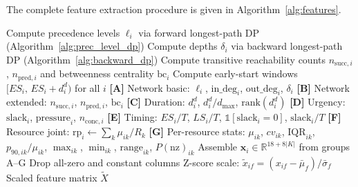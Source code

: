The complete feature extraction procedure is given in
Algorithm~\ref{alg:features}.
\begin{algorithm}[ht]
\caption{Comprehensive feature extraction for activity grouping}
\label{alg:features}
\begin{algorithmic}[1]
\State Compute precedence levels $\ell_i$ via forward
       longest-path DP (Algorithm~\ref{alg:prec_level_dp})
\State Compute depths $\delta_i$ via backward longest-path DP
       (Algorithm~\ref{alg:backward_dp})
\State Compute transitive reachability counts
       $n_{\mathrm{succ},i}$, $n_{\mathrm{pred},i}$
       and betweenness centrality $\mathrm{bc}_i$
\State Compute early-start windows
       $[ES_i,\, ES_i + d_i^d)$ for all $i$
    \State \textbf{[A]} Network basic:
           $\ell_i$, $\mathrm{in\_deg}_i$,
           $\mathrm{out\_deg}_i$, $\delta_i$
    \State \textbf{[B]} Network extended:
           $n_{\mathrm{succ},i}$,
           $n_{\mathrm{pred},i}$, $\mathrm{bc}_i$
    \State \textbf{[C]} Duration:
           $d_i^d$, $d_i^d / d_{\max}$,
           $\mathrm{rank}(d_i^d)$
    \State \textbf{[D]} Urgency:
           $\mathrm{slack}_i$,
           $\mathrm{pressure}_i$,
           $n_{\mathrm{conc},i}$
    \State \textbf{[E]} Timing:
           $ES_i/T$, $LS_i/T$,
           $\mathbb{1}[\mathrm{slack}_i{=}0]$,
           $\mathrm{slack}_i/T$
    \State \textbf{[F]} Resource joint:
           $\mathrm{rp}_i \leftarrow
           \sum_{k} \mu_{ik}/R_k$
        \State \textbf{[G]} Per-resource stats:
               $\mu_{ik}$, $cv_{ik}$,
               $\mathrm{IQR}_{ik}$,
               $p_{90,ik}/\mu_{ik}$,
               $\max_{ik}$, $\min_{ik}$,
               $\mathrm{range}_{ik}$,
               $P(\text{nz})_{ik}$
    \EndFor
    \State Assemble $\mathbf{x}_i \in \mathbb{R}^{18+8|K|}$
           from groups A--G
\EndFor
\State Drop all-zero and constant columns
\State Z-score scale:
       $\tilde{x}_{if} = (x_{if}-\bar{\mu}_f)/\bar{\sigma}_f$
\State \Return Scaled feature matrix $\tilde{X}$
\end{algorithmic}
\end{algorithm}

